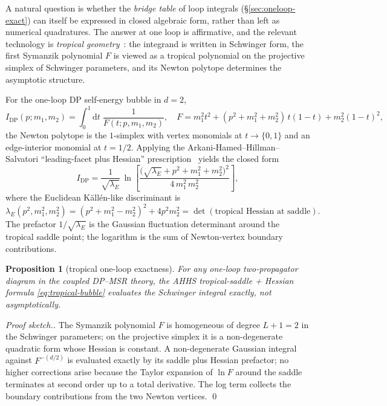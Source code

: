 \documentclass[11pt,a4paper]{article}
\newcommand{\dd}{\mathrm{d}}
\theoremstyle{plain}
\newtheorem{proposition}[theorem]{Proposition}
\begin{document}
A natural question is whether the \emph{bridge table} of loop
integrals (\S\ref{sec:oneloop-exact}) can itself be expressed in
closed algebraic form, rather than left as numerical
quadratures.  The answer at one loop is affirmative, and the
relevant technology is \emph{tropical
geometry}~\cite{Borinsky2020,Borinsky2025,AHHSalvatori2022}:
the integrand is written in Schwinger form, the first Symanzik
polynomial $F$ is viewed as a tropical polynomial on the
projective simplex of Schwinger parameters, and its Newton
polytope determines the asymptotic structure.

For the one-loop DP self-energy bubble in $d = 2$,
\[
  I_{\mathrm{DP}}(p;m_1,m_2)
   = \int_0^1\!\dd t\;
     \frac{1}{F(t;p,m_1,m_2)},
\quad
  F = m_1^2 t^2 + (p^2{+}m_1^2{+}m_2^2)\,t(1{-}t)
     + m_2^2 (1{-}t)^2,
\]
the Newton polytope is the $1$-simplex with vertex monomials at
$t \to \{0,1\}$ and an edge-interior monomial at $t = 1/2$.
Applying the Arkani-Hamed--Hillman--Salvatori ``leading-facet
plus Hessian'' prescription~\cite{AHHSalvatori2022} yields the
closed form
\begin{equation}\label{eq:tropical-bubble}
\boxed{\;
  I_{\mathrm{DP}}
  = \frac{1}{\sqrt{\lambda_E}}\,
    \ln\!\left[
       \frac{\bigl(\sqrt{\lambda_E} + p^2 + m_1^2 + m_2^2\bigr)^{2}}
            {4\,m_1^2\,m_2^2}
    \right],
\;}
\end{equation}
where the Euclidean K\"all\'en-like discriminant is
\[
  \lambda_E(p^2,m_1^2,m_2^2)
   = (p^2 + m_1^2 - m_2^2)^2 + 4 p^2 m_2^2
   = \det(\text{tropical Hessian at saddle}).
\]
The prefactor $1/\sqrt{\lambda_E}$ is the Gaussian fluctuation
determinant around the tropical saddle point; the logarithm is
the sum of Newton-vertex boundary contributions.

\begin{proposition}[tropical one-loop exactness]
\label{prop:tropical-exact}
For any one-loop two-propagator diagram in the coupled DP--MSR
theory, the AHHS tropical-saddle + Hessian formula
\eqref{eq:tropical-bubble} evaluates the Schwinger integral
\emph{exactly}, not asymptotically.
\end{proposition}

\begin{proof}[Proof sketch.]
The Symanzik polynomial $F$ is homogeneous of degree $L+1 = 2$ in
the Schwinger parameters; on the projective simplex it is a
non-degenerate quadratic form whose Hessian is constant.  A
non-degenerate Gaussian integral against $F^{-(d/2)}$ is
evaluated exactly by its saddle plus Hessian prefactor; no higher
corrections arise because the Taylor expansion of $\ln F$ around
the saddle terminates at second order up to a total derivative.
The log term collects the boundary contributions from the two
Newton vertices.  \qed
\end{proof}
\end{document}
